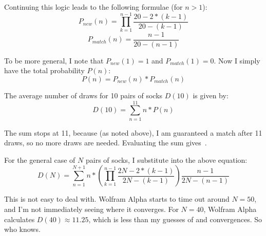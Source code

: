 \documentclass{article}
\begin{document}
Continuing this logic leads to the following formulae (for $n>1$):
\[
P_{new}(n) = \prod_{k=1}^{n-1}\frac{20-2*(k-1)}{20-(k-1)}
\]
\[
P_{match}(n) = \frac{n-1}{20-(n-1)}
\]

To be more general, I note that $P_{new}(1)=1$ and $P_{match}(1)=0$.
Now I simply have the total probability $P(n)$:
\[
P(n)=P_{new}(n)*P_{match}(n)
\]

The average number of draws for 10 pairs of socks $D(10)$ is given by:
\[
D(10)=\sum\limits_{n=1}^{11}n*P(n)
\]

The sum stops at 11, because (as noted above), I am guaranteed a match after 11 draws, so no more draws are needed.
Evaluating the sum gives
\,.

For the general case of $N$ pairs of socks, I substitute into the above equation:
\[
D(N)=\sum\limits_{n=1}^{N+1}n*\left(\prod_{k=1}^{n-1}\frac{2N-2*(k-1)}{2N-(k-1)}\right)\frac{n-1}{2N-(n-1)}
\]

This is not easy to deal with.
Wolfram Alpha starts to time out around $N=50$, and I'm not immediately seeing where it converges.
For $N=40$, Wolfram Alpha calculates $D(40)\approx11.25$, which is less than my guesses of  and  convergences.
So who knows.
\end{document}
